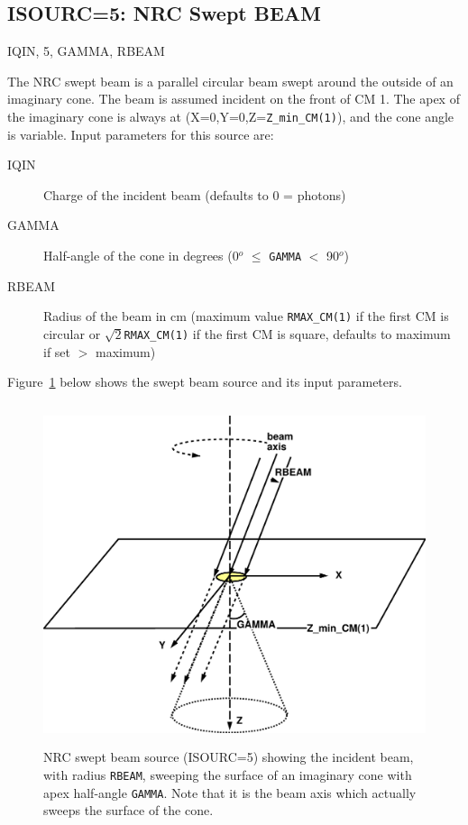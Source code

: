 \documentclass[12pt,twoside]{article}
\newcommand{\cen}[1]{\begin{center} #1 \end{center}                   }
\begin{document}
\subsection{ISOURC=5: NRC Swept BEAM}
\cen{IQIN, 5, GAMMA, RBEAM}
The NRC swept beam is a parallel circular beam
swept around the outside
of an imaginary cone.  The beam is assumed incident on the front of CM
1.  The apex of the imaginary cone is always at
(X=0,Y=0,Z=\verb+Z_min_CM(1)+), and the cone angle is variable.
Input parameters for this source are:
\begin{description}
\item [IQIN] Charge of the incident beam (defaults to 0 = photons)
\item [GAMMA] Half-angle of the cone in degrees (0$^o$ $\leq$ \verb+GAMMA+ $<$
90$^o$)
\item [RBEAM] Radius of the beam in cm (maximum value \verb+RMAX_CM(1)+
 if the
first CM
is circular or $\sqrt{2}$\verb+RMAX_CM(1)+
 if the first CM is square, defaults to
maximum if set $>$ maximum)
\end{description}
Figure~\ref{fig_src5} below shows the swept beam source and its input
parameters.
\begin{figure}[htbp]
\begin{center}
\leavevmode
\mbox{}\hspace{0cm}
\includegraphics[height=10cm]{figures/src5}
\caption[ISOURC=5: NRC swept beam]
{NRC swept beam source (ISOURC=5) showing the incident beam, with radius
{\tt RBEAM},
sweeping the surface of an imaginary cone with apex half-angle {\tt GAMMA}.
Note that it is the beam axis which actually sweeps the surface of the
cone.}
\label{fig_src5}
\end{center}
\end{figure}
\end{document}

